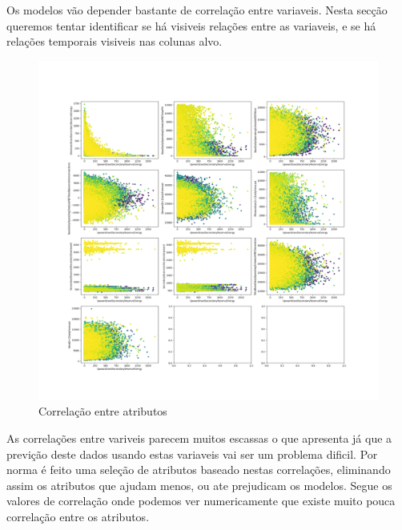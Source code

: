 Os modelos vão depender bastante de correlação entre variaveis.
Nesta secção queremos tentar identificar se há visiveis relações entre as variaveis, e se há relações temporais  visiveis nas colunas alvo.



\begin{figure}[H]
  \centering
  \includegraphics[width=\textwidth]{../plots/feature_correlation.png}
  \caption{Correlação entre atributos}
\end{figure}

As correlações entre variveis parecem muitos escassas o que apresenta já que a previção deste dados usando estas variaveis vai ser um problema dificil.
Por norma é feito uma seleção de  atributos baseado nestas correlações, eliminando assim os atributos que ajudam menos, ou ate prejudicam os modelos.
Segue os valores de correlação onde podemos ver numericamente que existe muito pouca correlação entre os atributos.

